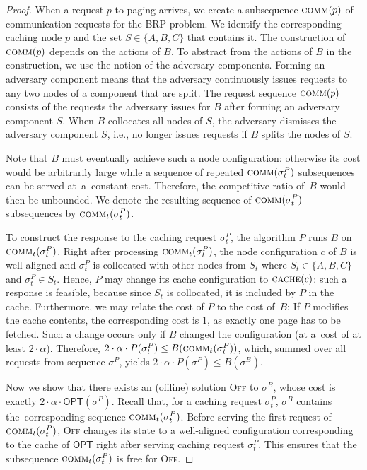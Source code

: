 \documentclass[manuscript,screen=true, review, anonymous]{acmart}
\newcommand{\OPT}{\textsf{OPT}\xspace}
\newcommand{\comm}{\textsc{comm}}
\newcommand{\OFF}{\textsc{Off}\xspace}
\begin{document}
\begin{proof}
\medskip

When a request $p$ to paging arrives, we create a subsequence $\comm(p)$ of communication requests for the BRP problem.
We identify the corresponding caching node $p$ and the set $S \in \{ A,B,C \}$ that contains it.
The construction of $\comm(p)$ depends on the actions of $B$.
To abstract from the actions of $B$ in the construction, we use the notion of the adversary components.
Forming an adversary component means that the adversary continuously issues requests to any two nodes of a component that are split.
The request sequence $\comm(p)$ consists of the requests the adversary issues for $B$ after forming an adversary component $S$.
When $B$ collocates all nodes of $S$, the adversary dismisses the adversary component $S$, i.e., no longer issues requests if $B$ splits the nodes of $S$.

Note that $B$ must eventually achieve such a node configuration: otherwise its cost would be arbitrarily large while a sequence of repeated $\comm(\sigma^P_t)$ subsequences can be served at~a~constant cost.
Therefore, the competitive ratio of~$B$ would then be unbounded.
We denote the resulting sequence of $\comm(\sigma^P_t)$ subsequences by $\comm_t(\sigma^P_t)$.


To construct the response to the caching request $\sigma^P_t$, the algorithm $P$ runs $B$ on $\comm_t(\sigma^P_t)$.
Right after processing $\comm_t(\sigma^P_t)$, the node configuration $c$ of $B$ is well-aligned and $\sigma^P_t$ is collocated with other nodes from $S_t$ where $S_t \in \{A,B, C\}$ and $\sigma^P_t \in S_t$.
Hence, $P$ may change its cache configuration to $\textsc{cache}(c)$: such a response is feasible, because since $S_t$ is collocated, it is included by $P$ in the cache.
Furthermore, we may relate the cost of $P$ to the cost of~$B$: If $P$ modifies the cache contents, the corresponding cost is $1$, as exactly one page has to
be fetched.
Such a change occurs only if $B$ changed the configuration (at a~cost of at least $2 \cdot \alpha$).
Therefore, $2\cdot \alpha \cdot P(\sigma^P_t) \leq B(\comm_t(\sigma^P_t))$, which, summed over all requests from sequence $\sigma^P$, yields $2 \cdot
\alpha \cdot P(\sigma^P) \leq B(\sigma^B)$.

\medskip

Now we show that there exists an (offline) solution \OFF to $\sigma^B$, whose cost is exactly ${2 \cdot \alpha \cdot \OPT(\sigma^P)}$.
Recall that, for a caching request $\sigma^P_t$, $\sigma^B$ contains the~corresponding sequence $\comm_t(\sigma^P_t)$.
Before serving the first request of~$\comm_t(\sigma^P_t)$, \OFF changes its state to a well-aligned configuration corresponding to the cache of $\OPT$ right after serving caching request $\sigma^P_t$.
This ensures that the subsequence $\comm_t(\sigma^P_t)$ is free for \OFF. 


\end{proof}
\end{document}
